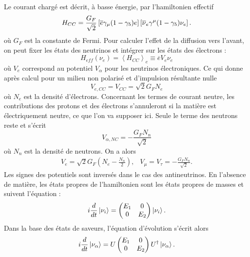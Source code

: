         Le courant chargé est décrit, à basse énergie, par l'hamiltonien effectif\cite{Akhmedov2000}
        \begin{equation}
          H_{CC} = \frac{G_F}{\sqrt{2}}\left[\overline{e}\gamma_{\mu}(1-\gamma_5)e\right]\left[\overline{\nu}_e\gamma^{\mu}(1-\gamma_5)\nu_e\right].
        \end{equation}
        où $G_F$ est la constante de Fermi. Pour calculer l'effet de la diffusion vers l'avant, on peut fixer les états des neutrinos et intégrer sur les états des électrons : 
        \begin{equation}
          H_{eff}(\nu_e) = \left<H_{CC}\right>_{e} \equiv \overline{e}V_e\nu_e
        \end{equation}
        où $V_e$ correspond au potentiel $V_{\alpha}$ pour les neutrinos électroniques. Ce qui donne après calcul pour un milieu non polarisé et d'impulsion résultante nulle\cite{Akhmedov2000}
        \begin{equation}
          V_{e,CC} = V_{CC} = \sqrt{2}G_F N_e
        \end{equation}
        où $N_e$ est la densité d'électrons. Concernant les termes de courant neutre, les contributions des protons et des électrons s'annuleront si la matière est électriquement neutre, ce que l'on va supposer ici. Seule le terme des neutrons reste et s'écrit 
        \begin{equation}
          V_{\alpha,NC} = -\frac{G_F N_n}{\sqrt{2}}
        \end{equation}
        où $N_n$ est la densité de neutrons. On a alors 
        \begin{eqnarray}
          V_e = \sqrt{2}G_F\left(N_e-\frac{N_n}{2}\right), & V_{\mu} = V_{\tau} = -\frac{G_F N_n}{\sqrt{2}}.
        \end{eqnarray}
        Les signes des potentiels sont inversés dans le cas des antineutrinos.
        En l'absence de matière, les états propres de l'hamiltonien sont les états propres de masses et suivent l'équation :
        \begin{equation}
          i\frac{d}{dt}\ket{\nu_i} = \left(\begin{matrix}E_1 & 0 \\ 0 & E_2\end{matrix}\right)\ket{\nu_i}.
        \end{equation}
        Dans la base des états de saveurs, l'équation d'évolution s'écrit alors
        \begin{equation}\label{eq::evolution_matter_2flavor}
          i\frac{d}{dt}\ket{\nu_{\alpha}} = U\left(\begin{matrix}E_1 & 0 \\ 0 & E_2\end{matrix}\right)U^{\dagger}\ket{\nu_{\alpha}}.
        \end{equation}
